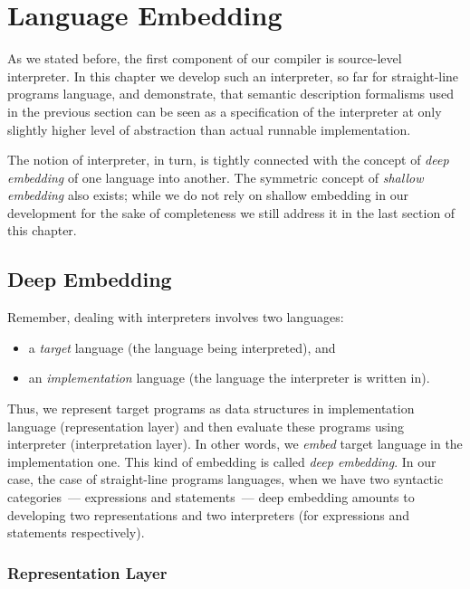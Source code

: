 \chapter{Language Embedding}

As we stated before, the first component of our compiler is source-level interpreter. In this chapter we
develop such an interpreter, so far for straight-line programs language, and demonstrate, that semantic
description formalisms used in the previous section can be seen as a specification of the interpreter at
only slightly higher level of abstraction than actual runnable implementation.

The notion of interpreter, in turn, is tightly connected with the concept of \emph{deep embedding} of one language
into another. The symmetric concept of \emph{shallow embedding} also exists; while we do not rely on shallow embedding
in our development for the sake of completeness we still address it in the last section of this chapter.

\section{Deep Embedding}

Remember, dealing with interpreters involves two languages:

\begin{itemize}
\item a \emph{target} language (the language being interpreted), and
\item an \emph{implementation} language (the language the interpreter is written in).
\end{itemize}

Thus, we represent target programs as data structures in implementation language (representation layer) and
then evaluate these programs using interpreter (interpretation layer). In other words, we \emph{embed}
target language in the implementation one. This kind of embedding is called \emph{deep embedding}. In our
case, the case of straight-line programs languages, when we have two syntactic categories~--- expressions and
statements~--- deep embedding amounts to developing two representations and two interpreters (for expressions
and statements respectively).

\subsection{Representation Layer}


